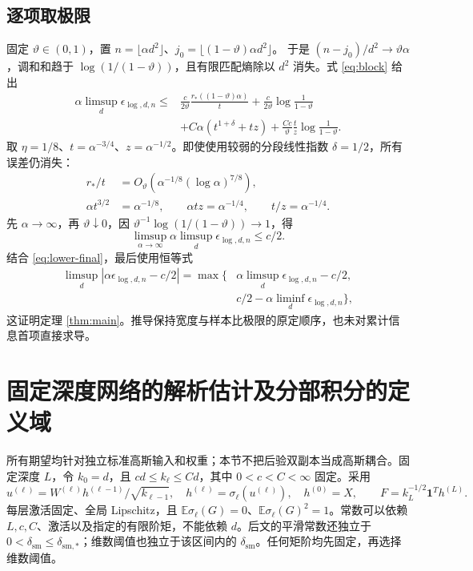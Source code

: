 \documentclass[a4paper]{tufte-handout}
\newcommand{\dsm}{\delta_{\mathrm{sm}}}
\begin{document}
\begin{fullwidth}
\subsection{逐项取极限}
固定 $\vartheta\in(0,1)$，置
$n=\lfloor\alpha d^2\rfloor$、$j_0=\lfloor(1-\vartheta)\alpha d^2\rfloor$。
于是 $(n-j_0)/d^2\to\vartheta\alpha$，调和和趋于
$\log(1/(1-\vartheta))$，且有限匹配熵除以 $d^2$ 消失。式 \eqref{eq:block} 给出
\begin{equation}\label{eq:limit-upper}\begin{aligned}
\alpha\limsup_d\epsilon_{\log,d,n}\le{}&
\frac c{2\vartheta}\frac{r_*((1-\vartheta)\alpha)}t
+\frac c{2\vartheta}\log\frac1{1-\vartheta}\\
&+C\alpha(t^{1+\delta}+tz)
+\frac{Cc}{\vartheta}\frac tz\log\frac1{1-\vartheta}.
\end{aligned}\end{equation}
取 $\eta=1/8$、$t=\alpha^{-3/4}$、$z=\alpha^{-1/2}$。即使使用较弱的分段线性指数 $\delta=1/2$，所有误差仍消失：
\begin{align*}
r_*/t&=O_\vartheta(\alpha^{-1/8}(\log\alpha)^{7/8}),\\
\alpha t^{3/2}&=\alpha^{-1/8},\qquad
\alpha tz=\alpha^{-1/4},\qquad t/z=\alpha^{-1/4}.
\end{align*}
先 $\alpha\to\infty$，再 $\vartheta\downarrow0$，因
$\vartheta^{-1}\log(1/(1-\vartheta))\to1$，得
\[
\limsup_{\alpha\to\infty}\alpha\limsup_d\epsilon_{\log,d,n}\le c/2.
\]
结合 \eqref{eq:lower-final}，最后使用恒等式
\begin{equation}\begin{aligned}
\limsup_d|\alpha \epsilon_{\log,d,n}-c/2|
=\max\{&\alpha\limsup_d\epsilon_{\log,d,n}-c/2,\\
&c/2-\alpha\liminf_d\epsilon_{\log,d,n}\},
\end{aligned}\end{equation}
这证明定理 \ref{thm:main}。推导保持宽度与样本比极限的原定顺序，也未对累计信息首项直接求导。


\appendix
\section{固定深度网络的解析估计及分部积分的定义域}\label{an:appendix}\label{an:section}\label{app:local}
所有期望均针对独立标准高斯输入和权重；本节不把后验双副本当成高斯耦合。固定深度 $L$，令 $k_0=d$，且 $cd\le k_\ell\le Cd$，其中 $0<c<C<\infty$ 固定。采用
\[
 u^{(\ell)}=W^{(\ell)} h^{(\ell-1)}/\sqrt{k_{\ell-1}},\quad
 h^{(\ell)}=\sigma_\ell(u^{(\ell)}),\quad h^{(0)}=X,\qquad
 F=k_L^{-1/2}\boldsymbol1^Th^{(L)}.
\]
每层激活固定、全局 Lipschitz，且 $\mathbb E\sigma_\ell(G)=0$、$\mathbb E\sigma_\ell(G)^2=1$。常数可以依赖 $L,c,C$、激活以及指定的有限阶矩，不能依赖 $d$。后文的平滑常数还独立于 $0<\dsm\le\delta_{\mathrm{sm},*}$；维数阈值也独立于该区间内的 $\dsm$。任何矩阶均先固定，再选择维数阈值。


\end{fullwidth}
\end{document}

